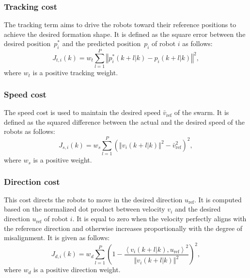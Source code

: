 \subsubsection{Tracking cost}\label{sec:tracking_term}
The tracking term aims to drive the robots toward their reference positions to achieve the desired formation shape. It is defined as the square error between the desired position~$p_i^*$ and the predicted position~$p_i$ of robot $i$ as follows:
\begin{equation}
    J_{t,i}(k)=w_t\sum_{l=1}^P{\left\Vert p^*_i(k+l|k)-p_i(k+l|k)\right\Vert^2},
\end{equation}
where $w_t$ is a positive tracking weight.

\subsubsection{Speed cost}
The speed cost is used to maintain the desired speed $\bar{v}_\text{ref}$ of the swarm. It is defined as the squared difference between the actual and the desired speed of the robots as follows:
\begin{equation}
    J_{s,i}(k)=w_s\sum_{l=1}^P\left(\left\Vert v_i(k+l|k)\right\Vert^2-\bar{v}_\text{ref}^2\right)^2,
\end{equation}
where $w_s$ is a positive weight.

\subsubsection{Direction cost}
This cost directs the robots to move in the desired direction $u_\text{ref}$. It is computed based on the normalized dot product between velocity $v_i$ and the desired direction $u_\text{ref}$ of robot $i$. It is equal to zero when the velocity perfectly aligns with the reference direction and otherwise increases proportionally with the degree of misalignment. It is given as follows:
\begin{equation}
    J_{d,i}(k)=w_d\sum_{l=1}^P{\left(1-\dfrac{\left\langle v_i\left(k+l|k\right),u_\text{ref}\right\rangle^2}{\left\Vert v_i(k+l|k)\right\Vert^2}\right)^2},
\end{equation}
where $w_d$ is a positive direction weight.

